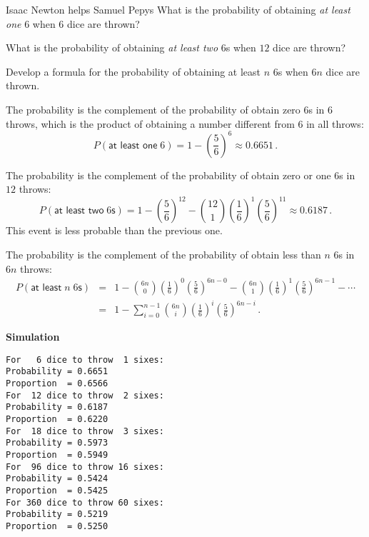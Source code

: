\begin{prob}{Isaac Newton helps Samuel Pepys}
 What is the probability of obtaining \emph{at least one} $6$ when $6$ dice are thrown?

 What is the probability of obtaining \emph{at least two} $6$s when $12$ dice are thrown?

 Develop a formula for the probability of obtaining at least $n$ $6$s when $6n$ dice are thrown.
\end{prob}

\solution{}

 The probability is the complement of the probability of obtain zero $6$s in $6$ throws, which is the product of obtaining a number different from $6$ in all throws:
\[
P(\textsf{at least one}\; 6)=1-\left(\frac{5}{6}\right)^6\approx 0.6651\,.
\]

 The probability is the complement of the probability of obtain zero or one $6$s in $12$ throws:
\[
P(\textsf{at least two}\;6\textsf{s})=1-\left(\frac{5}{6}\right)^{12}-{12\choose 1}\left(\frac{1}{6}\right)^{1}\left(\frac{5}{6}\right)^{11}\approx 0.6187\,.
\]
This event is less probable than the previous one.

 The probability is the complement of the probability of obtain less than $n$ $6$s in $6n$ throws:
\begin{eqnarray*}
P(\textsf{at least}\;n\;6\textsf{s})&=&
  1-{6n \choose 0}\left(\frac{1}{6}\right)^0\left(\frac{5}{6}\right)^{6n-0}-
  {6n\choose 1}\left(\frac{1}{6}\right)^{1}\left(\frac{5}{6}\right)^{6n-1}-\cdots\\
&=&1-\sum_{i=0}^{n-1}{6n\choose i}\left(\frac{1}{6}\right)^{i}\left(\frac{5}{6}\right)^{6n-i}\,.
\end{eqnarray*}

\textbf{Simulation}
\begin{verbatim}
For   6 dice to throw  1 sixes:
Probability = 0.6651
Proportion  = 0.6566
For  12 dice to throw  2 sixes:
Probability = 0.6187
Proportion  = 0.6220
For  18 dice to throw  3 sixes:
Probability = 0.5973
Proportion  = 0.5949
For  96 dice to throw 16 sixes:
Probability = 0.5424
Proportion  = 0.5425
For 360 dice to throw 60 sixes:
Probability = 0.5219
Proportion  = 0.5250
\end{verbatim}


